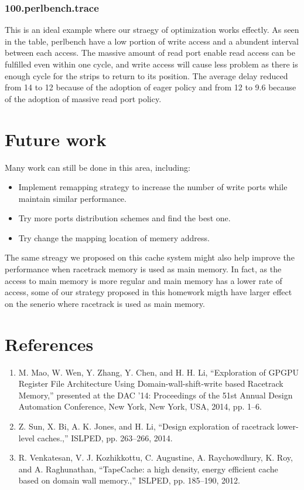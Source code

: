 \documentclass[11pt]{article}
\begin{document}
\subsubsection{100.perlbench.trace}
This is an ideal example where our straegy of optimization works effectly. As seen in the table, perlbench have a low portion of write access and a abundent interval between each access. The massive amount of read port enable read access can be fulfilled even within one cycle, and write access will cause less problem as there is enough cycle for the strips to return to its position. The average delay reduced from 14 to 12 because of the adoption of eager policy and from 12 to 9.6 because of the adoption of massive read port policy.


\section{Future work}
Many work can still be done in this area, including:
\begin{itemize}
\item Implement remapping strategy to increase the number of write ports while maintain similar performance.
\item Try more ports distribution schemes and find the best one.
\item Try change the mapping location of memery address.
\end{itemize}
The same streagy we proposed on this cache system might also help improve the performance when racetrack memory is used as main memory. In fact, as the access to main memory is more regular and main memory has a lower rate of access, some of our strategy proposed in this homework migth have larger effect on the senerio where racetrack is used as main memory.

\newpage

\section*{References}

\begin{enumerate}
\item M. Mao, W. Wen, Y. Zhang, Y. Chen, and H. H. Li, ``Exploration of GPGPU Register File Architecture Using Domain-wall-shift-write based Racetrack Memory,'' presented at the DAC '14: Proceedings of the 51st Annual Design Automation Conference, New York, New York, USA, 2014, pp. 1–6.
\item Z. Sun, X. Bi, A. K. Jones, and H. Li, ``Design exploration of racetrack lower-level caches.,'' ISLPED, pp. 263–266, 2014.
\item R. Venkatesan, V. J. Kozhikkottu, C. Augustine, A. Raychowdhury, K. Roy, and A. Raghunathan, ``TapeCache: a high density, energy efficient cache based on domain wall memory.,'' ISLPED, pp. 185–190, 2012.
\end{enumerate}
\end{document}
